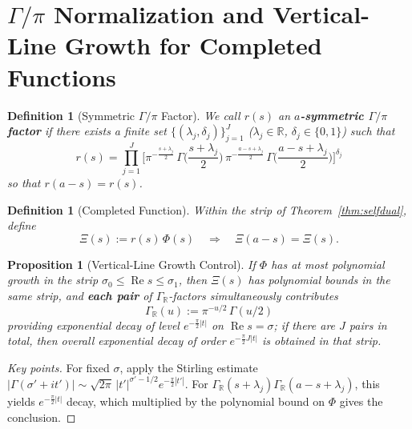 \documentclass[11pt,a4paper]{article}
\newtheorem{proposition}[theorem]{Proposition}
\newtheorem{definition}[theorem]{Definition}
\theoremstyle{remark}
\DeclareMathOperator{\Re}{Re}
\begin{document}
\section{$\Gamma/\pi$ Normalization and Vertical-Line Growth for Completed Functions}

\begin{definition}[Symmetric $\Gamma/\pi$ Factor]\label{def:gamma}
We call $r(s)$ an \textbf{$a$-symmetric $\Gamma/\pi$ factor} if there exists a finite set $\{(\lambda_j,\delta_j)\}_{j=1}^J$ ($\lambda_j\in\mathbb{R}$, $\delta_j\in\{0,1\}$) such that
\begin{equation}
r(s)=\prod_{j=1}^J\Big[\pi^{-\frac{s+\lambda_j}{2}}\,\Gamma\Big(\frac{s+\lambda_j}{2}\Big)\,\pi^{-\frac{a-s+\lambda_j}{2}}\,\Gamma\Big(\frac{a-s+\lambda_j}{2}\Big)\Big]^{\delta_j}
\end{equation}
so that $r(a-s)=r(s)$.
\end{definition}

\begin{definition}[Completed Function]\label{def:completed}
Within the strip of Theorem~\ref{thm:selfdual}, define
\begin{equation}
\Xi(s):=r(s)\,\Phi(s)\quad\Rightarrow\quad \Xi(a-s)=\Xi(s).
\end{equation}
\end{definition}

\begin{proposition}[Vertical-Line Growth Control]\label{prop:growth}
If $\Phi$ has at most polynomial growth in the strip $\sigma_0\le\Re s\le \sigma_1$, then $\Xi(s)$ has polynomial bounds in the same strip, and \textbf{each pair} of $\Gamma_{\mathbb{R}}$-factors simultaneously contributes
\begin{equation}
\Gamma_{\mathbb{R}}(u):=\pi^{-u/2}\,\Gamma(u/2)
\end{equation}
providing exponential decay of level \textbf{$e^{-\frac{\pi}{2}|t|}$} on $\Re s=\sigma$; if there are $J$ pairs in total, then overall exponential decay of order $e^{-\frac{\pi}{2}J|t|}$ is obtained in that strip.
\end{proposition}

\begin{proof}[Key points]
For fixed $\sigma$, apply the Stirling estimate
$|\Gamma(\sigma'+it')|\sim \sqrt{2\pi}\,|t'|^{\sigma'-1/2}e^{-\frac{\pi}{2}|t'|}$.
For $\Gamma_{\mathbb{R}}(s+\lambda_j)\Gamma_{\mathbb{R}}(a-s+\lambda_j)$, this yields $e^{-\frac{\pi}{2}|t|}$ decay, which multiplied by the polynomial bound on $\Phi$ gives the conclusion.
\end{proof}
\end{document}

